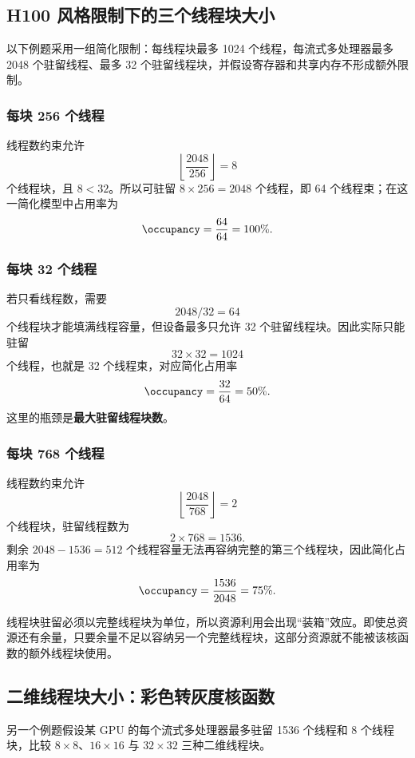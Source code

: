 \subsection{H100 风格限制下的三个线程块大小}

以下例题采用一组简化限制：每线程块最多 1024 个线程，每流式多处理器最多 2048 个驻留线程、最多 32 个驻留线程块，并假设寄存器和共享内存不形成额外限制。

\subsubsection{每块 256 个线程}

线程数约束允许
\[
\left\lfloor\frac{2048}{256}\right\rfloor=8
\]
个线程块，且 \(8<32\)。所以可驻留 \(8\times256=2048\) 个线程，即 64 个线程束；在这一简化模型中占用率为
\[
\occupancy=\frac{64}{64}=100\%.
\]

\subsubsection{每块 32 个线程}

若只看线程数，需要
\[
2048/32=64
\]
个线程块才能填满线程容量，但设备最多只允许 32 个驻留线程块。因此实际只能驻留
\[
32\times32=1024
\]
个线程，也就是 32 个线程束，对应简化占用率
\[
\occupancy=\frac{32}{64}=50\%.
\]
这里的瓶颈是\textbf{最大驻留线程块数}。

\subsubsection{每块 768 个线程}

线程数约束允许
\[
\left\lfloor\frac{2048}{768}\right\rfloor=2
\]
个线程块，驻留线程数为
\[
2\times768=1536.
\]
剩余 \(2048-1536=512\) 个线程容量无法再容纳完整的第三个线程块，因此简化占用率为
\[
\occupancy=\frac{1536}{2048}=75\%.
\]

\begin{keybox}
线程块驻留必须以完整线程块为单位，所以资源利用会出现“装箱”效应。即使总资源还有余量，只要余量不足以容纳另一个完整线程块，这部分资源就不能被该核函数的额外线程块使用。
\end{keybox}

\subsection{二维线程块大小：彩色转灰度核函数}

另一个例题假设某 GPU 的每个流式多处理器最多驻留 1536 个线程和 8 个线程块，比较 \(8\times8\)、\(16\times16\) 与 \(32\times32\) 三种二维线程块。

